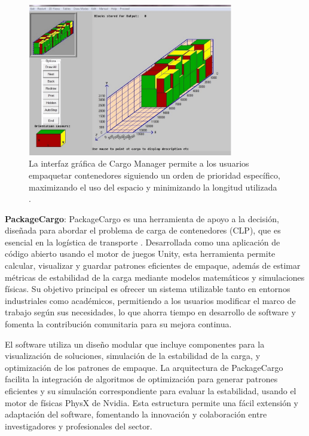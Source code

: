 \begin{figure}[H]
    \centering
    \includegraphics[width=0.8\textwidth]{Figures/cargomanager.png}
    \caption{La interfaz gráfica de Cargo Manager permite a los usuarios empaquetar contenedores siguiendo un orden de prioridad específico, maximizando el uso del espacio y minimizando la longitud utilizada \parencite{zhao2017three}.}
    \label{fig:cargomanager}
\end{figure}

\textbf{PackageCargo}: PackageCargo es una herramienta de apoyo a la decisión, diseñada para abordar el problema de carga de contenedores (CLP), que es esencial en la logística de transporte \parencite{MARTINEZFRANCO2020100601}. Desarrollada como una aplicación de código abierto usando el motor de juegos Unity, esta herramienta permite calcular, visualizar y guardar patrones eficientes de empaque, además de estimar métricas de estabilidad de la carga mediante modelos matemáticos y simulaciones físicas. Su objetivo principal es ofrecer un sistema utilizable tanto en entornos industriales como académicos, permitiendo a los usuarios modificar el marco de trabajo según sus necesidades, lo que ahorra tiempo en desarrollo de software y fomenta la contribución comunitaria para su mejora continua.

El software utiliza un diseño modular que incluye componentes para la visualización de soluciones, simulación de la estabilidad de la carga, y optimización de los patrones de empaque. La arquitectura de PackageCargo facilita la integración de algoritmos de optimización para generar patrones eficientes y su simulación correspondiente para evaluar la estabilidad, usando el motor de físicas PhysX de Nvidia. Esta estructura permite una fácil extensión y adaptación del software, fomentando la innovación y colaboración entre investigadores y profesionales del sector.

